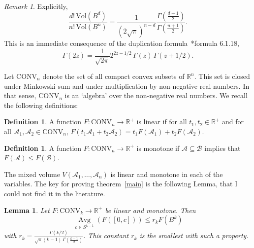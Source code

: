 \documentclass{amsart}
\newtheorem{lemma}[theorem]{Lemma}
\theoremstyle{definition}
\newtheorem{definition}[theorem]{Definition}
\theoremstyle{remark}
\newtheorem{remark}[theorem]{Remark}
\begin{document}
\begin{remark} Explicitly,
\[
\frac
{d!\, {\mathrm{Vol}}(B^d)}
{n!\, {\mathrm{Vol}}(B^n)}
=
\frac{1}{(2\sqrt{\pi})^{n-d}} \frac {\Gamma\left(\frac{d+1}{2}\right)} {\Gamma\left(\frac{n+1}{2}\right)} 
.
\]
This is an immediate consequence of the duplication formula~\cite{Abramowitz-Stegun}*{formula 6.1.18},
\[
\Gamma(2z) = \frac{1}{\sqrt{2 \pi}} 2^{2z-1/2}\, \Gamma(z)\, \Gamma(z+1/2).
\]
\end{remark}

Let ${\mathrm{CONV}_{{n}}}$ denote the set of all compact convex subsets of $\mathbb R^n$.
This set is closed under Minkowski sum and under multiplication by non-negative
real numbers. In that sense, ${\mathrm{CONV}_{{n}}}$ is an `algebra' over the non-negative
real numbers. We recall the following definitions:

\begin{definition}
A function $F: {\mathrm{CONV}_{{n}}} \rightarrow \mathbb R^{+}$ is linear if for all 
$t_1, t_2 \in \mathbb R^+$ and for all $\mathcal A_1, \mathcal A_2 \in {\mathrm{CONV}_{{n}}}$,
$F(t_1 \mathcal A_1 + t_2 \mathcal A_2) = t_1 F(\mathcal A_1) + t_2 F(\mathcal A_2)$.
\end{definition}

\begin{definition}
A function $F: {\mathrm{CONV}_{{n}}} \rightarrow \mathbb R^{+}$ is monotone if 
$\mathcal A \subseteq \mathcal B$ implies that $F(\mathcal A) \le F(\mathcal B)$.
\end{definition}

The mixed volume $V(\mathcal A_1, \dots, \mathcal A_n)$ is linear and
monotone in each of the variables. The key for proving theorem~\ref{main} is the following Lemma,
that I could not find it in the literature.

\begin{lemma}\label{lem:needle} Let  $F: {\mathrm{CONV}_{{k}}} \rightarrow \mathbb R^{+}$ be linear and monotone.
Then
\[
{\operatorname*{Avg}_{{c \in S^{k-1}}}} ( F([0,c])) \le r_k F(B^k)
\]
with $r_k = \frac{\Gamma(k/2)}{\sqrt{\pi} (k-1)\,  \Gamma\left( \frac{k-1}{2} \right)}$.
This constant $r_k$ is the smallest with such a property.
\end{lemma}
\end{document}
